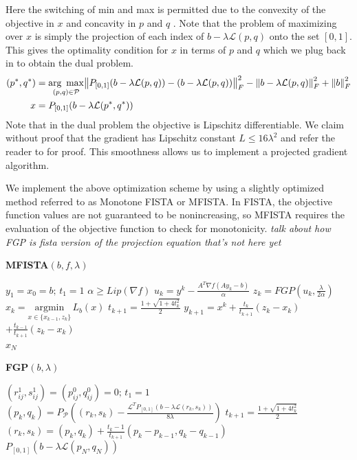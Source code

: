 \documentclass[10pt,a4paper]{article}
\begin{document}
	Here the switching of min and max is permitted due to the convexity of the objective in $x$ and concavity in $p$ and $q$ \cite{TV}.  Note that the problem of maximizing over $x$ is simply the projection of each index of  $b- \lambda\mathcal{L}(p,q)$ onto the set $[0,1]$.  This gives the optimality condition for $x$ in terms of $p$ and $q$ which we plug back in to obtain the dual problem.
	\begin{align*}
	(p^*,q^*) &= \underset{(p,q) \in \mathcal{P}}{\text{arg }\max}  \norm{P_{[0,1]}(b- \lambda\mathcal{L}(p,q)) -(b- \lambda\mathcal{L}(p,q))}_F^2 - \norm{b- \lambda\mathcal{L}(p,q)}_F^2+ \norm{b}_F^2\\
	x &= P_{[0,1]}(b- \lambda\mathcal{L}(p^*,q^*))
	\end{align*}
	Note that in the dual problem the objective is Lipschitz differentiable.  We claim without proof that the gradient has Lipschitz constant $L \leq 16 \lambda^2$ and refer the reader to \cite{TV} for proof.  This smoothness allows us to implement a projected gradient algorithm.
	
	We implement the above optimization scheme by using a slightly optimized method referred to as Monotone FISTA or MFISTA. In FISTA, the objective function values are not guaranteed to be nonincreasing, so MFISTA requires the evaluation of the objective function to check for monotonicity. \emph{talk about how FGP is fista version of the projection equation that's not here yet}
	\begin{framed}
		\begin{minipage}{0.48\textwidth}
			\textbf{MFISTA$(b,f, \lambda)$}
			\begin{algorithmic}
				\State $y_1 = x_0 = b; \, t_1 = 1$
				\State $\alpha \geq Lip(\nabla f)$
				\State $u_k = y^k - \frac{A^T\nabla f (A y_k - b)}{\alpha}$
				\State $z_k = FGP(u_k, \frac{\lambda}{2 \alpha})$
				\State $x_k = \underset{x \in \{x_{k-1},z_k\}}{\text{argmin}} \,L_b(x)$
				\State $t_{k+1} = \frac{1 + \sqrt{1 + 4t_k^2}}{2}$ 
				\State $y_{k+1} = x^k + \frac{t_k}{t_{k+1}}(z_k - x_k)$ 
				\State \hspace{10 mm}$+ \frac{t_{k-1}}{t_{k+1}}(z_k - x_k) $
				\EndFor\\
				\Return $x_N$
			\end{algorithmic}
		\end{minipage}
		\begin{minipage}{0.48\textwidth}
			
			\textbf{FGP$(b, \lambda)$}
			\begin{algorithmic}
				\State $(r_{ij}^1, s_{ij}^1) = (p_{ij}^0, q_{ij}^0) = 0; \, t_1 = 1$
				\For {$k = 1:N$}
				\State $(p_k,q_k) = P_\mathcal{P} \left( (r_k,s_k) - \frac{\mathcal{L}^TP_{[0,1]} (b - \lambda \mathcal{L}(r_k,s_k))}{8\lambda} \right)$
				\State $t_{k+1} = \frac{1 + \sqrt{1 + 4t_k^2}}{2}$ 
				\State $(r_k,s_k) = (p_k,q_k) + \frac{t_k-1}{t_{k+1}}(p_k-p_{k-1}, q_k-q_{k-1})$ 
				\EndFor \\
				\Return $P_{[0,1]} (b - \lambda \mathcal{L}(p_N,q_N))$
			\end{algorithmic}
			
		\end{minipage}
	\end{framed}
	
\end{document}
